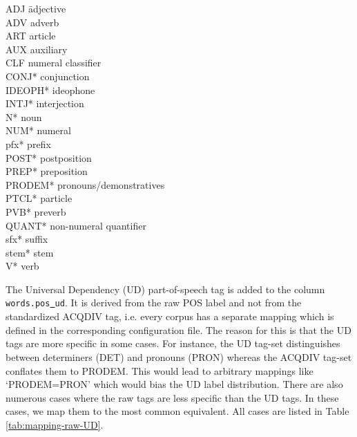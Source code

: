 \documentclass[a4paper, 11pt]{book}
\newcommand{\und}{\underline{{ }}\hspace{0.2mm}}	%
\begin{document}
\begin{multicols}{2}
	\begin{tabbing}
	ADJ \hspace{2cm} \= adjective \\
	ADV \> adverb \\
	ART \> article \\
	AUX \> auxiliary \\
	CLF \> numeral classifier \\
	CONJ* \> conjunction \\
	IDEOPH* \> ideophone \\
	INTJ* \> interjection \\
	N* \> noun \\
	NUM* \> numeral \\
	pfx* \> prefix \\
	POST* \> postposition \\
	PREP* \> preposition \\
	PRODEM* \> pronouns/demonstratives \\
	PTCL* \> particle \\
	PVB* \> preverb \\
	QUANT* \> non-numeral quantifier \\
	sfx* \> suffix \\
	stem* \> stem \\
	V* \> verb \\
	\end{tabbing}
\end{multicols}

The Universal Dependency (UD) part-of-speech tag is added to the column \texttt{words.pos\und ud}. It is derived from the raw POS label and not from the standardized ACQDIV tag, i.e. every corpus has a separate mapping which is defined in the corresponding configuration file. The reason for this is that the UD tags are more specific in some cases. For instance, the UD tag-set distinguishes between determiners (DET) and pronouns (PRON) whereas the ACQDIV tag-set conflates them to PRODEM. This would lead to arbitrary mappings like `PRODEM=PRON' which would bias the UD label distribution. There are also numerous cases where the raw tags are less specific than the UD tags. In these cases, we map them to the most common equivalent. All cases are listed in Table \ref{tab:mapping-raw-UD}.
\end{document}
